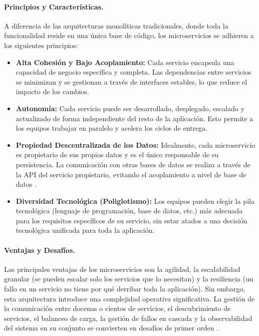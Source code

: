 \paragraph{Principios y Características.}
A diferencia de las arquitecturas monolíticas tradicionales, donde toda la funcionalidad reside en una única base de código, los microservicios se adhieren a los siguientes principios:
\begin{itemize}
    \item \textbf{Alta Cohesión y Bajo Acoplamiento:} Cada servicio encapsula una capacidad de negocio específica y completa. Las dependencias entre servicios se minimizan y se gestionan a través de interfaces estables, lo que reduce el impacto de los cambios.
    \item \textbf{Autonomía:} Cada servicio puede ser desarrollado, desplegado, escalado y actualizado de forma independiente del resto de la aplicación. Esto permite a los equipos trabajar en paralelo y acelera los ciclos de entrega.
    \item \textbf{Propiedad Descentralizada de los Datos:} Idealmente, cada microservicio es propietario de sus propios datos y es el único responsable de su persistencia. La comunicación con otras bases de datos se realiza a través de la API del servicio propietario, evitando el acoplamiento a nivel de base de datos \cite{richardson2018patterns}.
    \item \textbf{Diversidad Tecnológica (Poliglotismo):} Los equipos pueden elegir la pila tecnológica (lenguaje de programación, base de datos, etc.) más adecuada para los requisitos específicos de su servicio, sin estar atados a una decisión tecnológica unificada para toda la aplicación.
\end{itemize}

\paragraph{Ventajas y Desafíos.}
Las principales ventajas de los microservicios son la agilidad, la escalabilidad granular (se pueden escalar solo los servicios que lo necesitan) y la resiliencia (un fallo en un servicio no tiene por qué derribar toda la aplicación). Sin embargo, esta arquitectura introduce una complejidad operativa significativa. La gestión de la comunicación entre docenas o cientos de servicios, el descubrimiento de servicios, el balanceo de carga, la gestión de fallos en cascada y la observabilidad del sistema en su conjunto se convierten en desafíos de primer orden \cite{fowler2014microservices}.

